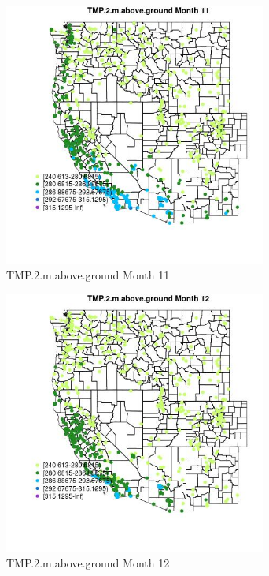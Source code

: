 \begin{figure} 
\centering  
\includegraphics[width=0.77\textwidth]{Code_Outputs/Report_ML_input_PM25_Step4_part_f_de_duplicated_aves_prioritize_24hr_obswNAs_MapObsMo11TMP2maboveground.jpg} 
\caption{\label{fig:Report_ML_input_PM25_Step4_part_f_de_duplicated_aves_prioritize_24hr_obswNAsMapObsMo11TMP2maboveground}TMP.2.m.above.ground Month 11} 
\end{figure} 
 

\begin{figure} 
\centering  
\includegraphics[width=0.77\textwidth]{Code_Outputs/Report_ML_input_PM25_Step4_part_f_de_duplicated_aves_prioritize_24hr_obswNAs_MapObsMo12TMP2maboveground.jpg} 
\caption{\label{fig:Report_ML_input_PM25_Step4_part_f_de_duplicated_aves_prioritize_24hr_obswNAsMapObsMo12TMP2maboveground}TMP.2.m.above.ground Month 12} 
\end{figure} 
 

